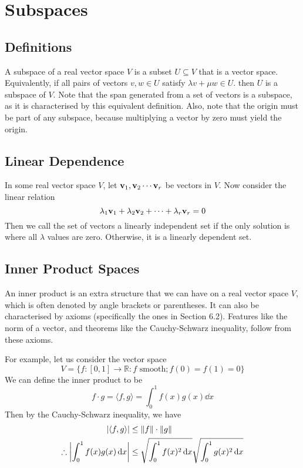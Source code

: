 \documentclass{article}
\begin{document}
\section{Subspaces}
\subsection{Definitions}
A subspace of a real vector space $V$ is a subset $U \subseteq V$ that is a vector space. Equivalently, if all pairs of vectors $v, w \in U$ satisfy $\lambda v + \mu w \in U$. then $U$ is a subspace of $V$. Note that the span generated from a set of vectors is a subspace, as it is characterised by this equivalent definition. Also, note that the origin must be part of any subspace, because multiplying a vector by zero must yield the origin.

\subsection{Linear Dependence}
In some real vector space $V$, let $\vb v_1, \vb v_2 \cdots \vb v_r$ be vectors in $V$. Now consider the linear relation
\[ \lambda_1 \vb v_1 + \lambda_2 \vb v_2 + \cdots + \lambda_r \vb v_r = 0 \]
Then we call the set of vectors a linearly independent set if the only solution is where all $\lambda$ values are zero. Otherwise, it is a linearly dependent set.

\subsection{Inner Product Spaces}
An inner product is an extra structure that we can have on a real vector space $V$, which is often denoted by angle brackets or parentheses. It can also be characterised by axioms (specifically the ones in Section 6.2). Features like the norm of a vector, and theorems like the Cauchy-Schwarz inequality, follow from these axioms.

For example, let us consider the vector space
\[ V = \{ f: [0, 1] \to \mathbb R: f \text{ smooth}; f(0) = f(1) = 0 \} \]
We can define the inner product to be
\[ f \cdot g = \langle f, g \rangle = \int_0^1 f(x)g(x)\dd{x} \]
Then by the Cauchy-Schwarz inequality, we have
\begin{align*}
    \abs{\langle f, g \rangle}               & \leq \norm{f} \cdot \norm{g}                                    \\
    \therefore \abs{\int_0^1 f(x)g(x)\dd{x}} & \leq \sqrt{\int_0^1 f(x)^2 \dd{x}}\sqrt{\int_0^1 g(x)^2 \dd{x}}
\end{align*}
\end{document}
